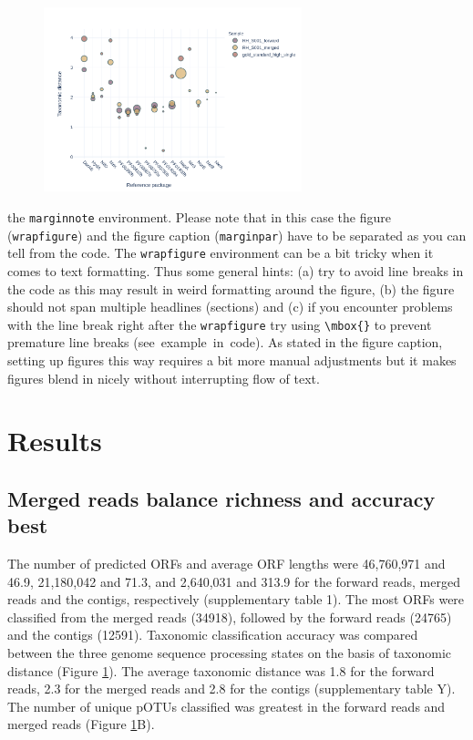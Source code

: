 \documentclass[10pt,letterpaper]{article}
\begin{document}
\begin{figure}
\includegraphics[width=75mm]{manuscript/figures/tax_dist_bubbles.png}
\captionsetup{labelformat=empty} %
\caption{} %
\label{fig1} %
\end{figure} %
the \verb!marginnote! environment. Please note that in this case the figure (\verb!wrapfigure!) and the figure caption (\verb!marginpar!) have to be separated as you can tell from the code. The \verb!wrapfigure! environment can be a bit tricky when it comes to text formatting. Thus some general hints: (a) try to avoid line breaks in the code as this may result in weird formatting around the figure, (b) the figure should not span multiple headlines (sections) and (c) if you encounter problems with the line break right after the \verb!wrapfigure! try using \verb!\mbox{}! to prevent premature line breaks (\mbox{see example in code}). As stated in the figure caption, setting up figures this way requires a bit more manual adjustments but it makes figures blend in nicely without interrupting flow of text.


\section*{Results}
\subsection*{Merged reads balance richness and accuracy best}
The number of predicted ORFs and average ORF lengths were 46,760,971 and 46.9, 21,180,042 and 71.3, and 2,640,031 and 313.9 for the forward reads, merged reads and the contigs, respectively (supplementary table 1). The most ORFs were classified from the merged reads (34918), followed by the forward reads (24765) and the contigs (12591).
Taxonomic classification accuracy was compared between the three genome sequence processing states on the basis of taxonomic distance (Figure \ref{fig1}). The average taxonomic distance was 1.8 for the forward reads, 2.3 for the merged reads and 2.8 for the contigs (supplementary table Y). The number of unique pOTUs classified was greatest in the forward reads and merged reads (Figure \ref{fig1}B). 
\end{document}
